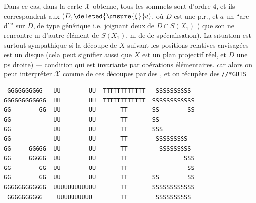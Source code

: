 Dans ce cas, dans la carte $\mathcal X$ obtenue,
tous les sommets sont d'ordre
$4$, et ils correspondent   aux
 $(D,\deleted{\unsure{\xi}}a)$, où $D$ est
une p.r., et $a$ un ``arc d'''
sur $\widetilde D$, de type générique i.e.
joignant deux   de $D\cap S(X_1)$
( que son  ne rencontre
ni d'autre élément de $S(X_1)$, ni de 
de spécialisation).
La situation est surtout sympathique
si la découpe de $X$ suivant les
positions relatives envisagées est un
disque (cela peut signifier aussi
que $X$ est un plan projectif
réel, et $D$ une ps droite) ---
condition qui est invariante par
opérations élémentaires, car
alors on peut interpréter $\mathcal X$ comme
 de ces découpes par des
, et on récupère des
\texttt{//*\quad GUTS\qquad{}}
\begin{verbatim}
 GGGGGGGGGG   UU        UU  TTTTTTTTTTTT   SSSSSSSSSS
GGGGGGGGGGGG  UU        UU  TTTTTTTTTTTT  SSSSSSSSSSSS
GG        GG  UU        UU       TT       SS        SS
GG            UU        UU       TT       SS
GG            UU        UU       TT       SSS
GG            UU        UU       TT        SSSSSSSSS
GG     GGGGG  UU        UU       TT         SSSSSSSSS
GG     GGGGG  UU        UU       TT                SSS
GG        GG  UU        UU       TT                 SS
GG        GG  UU        UU       TT       SS        SS
GGGGGGGGGGGG  UUUUUUUUUUUU       TT       SSSSSSSSSSSS
 GGGGGGGGGG    UUUUUUUUUU        TT        SSSSSSSSSS
\end{verbatim}
